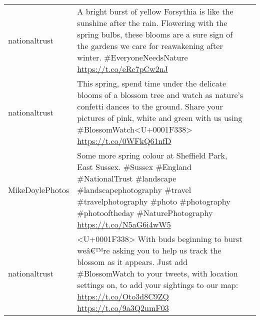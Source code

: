 \documentclass[
]{article}
\begin{document}
\begin{longtable}[]{@{}llr@{}}
\begin{minipage}[t]{0.22\columnwidth}\raggedright
nationaltrust\strut
\end{minipage} & \begin{minipage}[t]{0.49\columnwidth}\raggedright
A bright burst of yellow Forsythia is like the sunshine after the rain.
Flowering with the spring bulbs, these blooms are a sure sign of the
gardens we care for reawakening after winter. \#EveryoneNeedsNature
\url{https://t.co/eRc7pCw2nJ}\strut
\end{minipage} & \begin{minipage}[t]{0.21\columnwidth}\raggedleft
318\strut
\end{minipage}\tabularnewline
\begin{minipage}[t]{0.22\columnwidth}\raggedright
nationaltrust\strut
\end{minipage} & \begin{minipage}[t]{0.49\columnwidth}\raggedright
This spring, spend time under the delicate blooms of a blossom tree and
watch as nature's confetti dances to the ground. Share your pictures of
pink, white and green with us using
\#BlossomWatch\textless U+0001F338\textgreater{}
\url{https://t.co/0WFkQ61nfD}\strut
\end{minipage} & \begin{minipage}[t]{0.21\columnwidth}\raggedleft
278\strut
\end{minipage}\tabularnewline
\begin{minipage}[t]{0.22\columnwidth}\raggedright
MikeDoylePhotos\strut
\end{minipage} & \begin{minipage}[t]{0.49\columnwidth}\raggedright
Some more spring colour at Sheffield Park, East Sussex. \#Sussex
\#England \#NationalTrust \#landscape \#landscapephotography \#travel
\#travelphotography \#photo \#photography \#photooftheday
\#NaturePhotography \url{https://t.co/N5aG6i4wW5}\strut
\end{minipage} & \begin{minipage}[t]{0.21\columnwidth}\raggedleft
228\strut
\end{minipage}\tabularnewline
\begin{minipage}[t]{0.22\columnwidth}\raggedright
nationaltrust\strut
\end{minipage} & \begin{minipage}[t]{0.49\columnwidth}\raggedright
\textless U+0001F338\textgreater{} With buds beginning to burst weâ€™re
asking you to help us track the blossom as it appears. Just add
\#BlossomWatch to your tweets, with location settings on, to add your
sightings to our map: \url{https://t.co/Oto3d8C9ZQ}
\url{https://t.co/9a3Q2umF03}\strut
\end{minipage} & \begin{minipage}[t]{0.21\columnwidth}\raggedleft
210\strut
\end{minipage}\tabularnewline
\bottomrule
\end{longtable}
\end{document}
